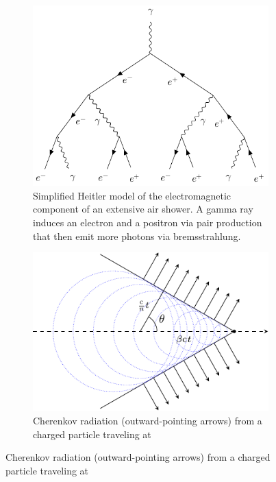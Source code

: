 \begin{figure}
    \begin{subfigure}[t]{0.45\textwidth}
        \centering
        \includegraphics[width=\textwidth]{graphics/heitler_model.pdf}
        \caption{Simplified Heitler model of the electromagnetic component of an extensive air shower.
        A gamma ray induces an electron and a positron via pair production that then emit more photons
        via bremsstrahlung.}
        \label{fig:heitler_model}
    \end{subfigure}
    \hfill
    \begin{subfigure}[t]{0.45\textwidth}
        \centering
        \includegraphics[width=\textwidth]{graphics/cherenkov_radiation.pdf}
        \caption{Cherenkov radiation (outward-pointing arrows) from a charged particle traveling at
}
\end{subfigure}
\end{figure}
